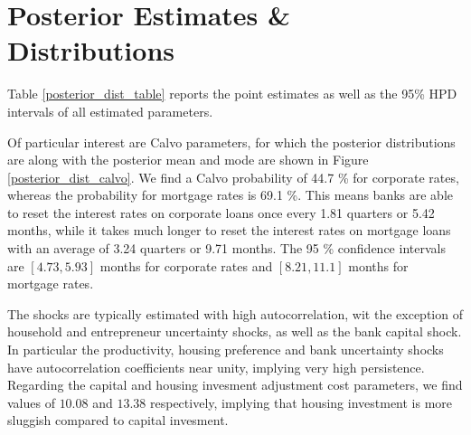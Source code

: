 \documentclass[12pt]{article}
\numberwithin{equation}{section}
\begin{document}
\section*{Posterior Estimates \& Distributions}

Table \ref{posterior_dist_table} reports the point estimates as well as the 95\% HPD intervals of all estimated parameters.

Of particular interest are Calvo parameters, for which the posterior distributions are along with the posterior mean and mode are shown in Figure \ref{posterior_dist_calvo}. We find a Calvo probability of 44.7 \% for corporate rates, whereas the probability for mortgage rates is 69.1 \%. This means banks are able to reset the interest rates on corporate loans once every 1.81 quarters or 5.42 months, while it takes much longer to reset the interest rates on mortgage loans with an average of 3.24 quarters or 9.71 months. The 95 \% confidence intervals are $[4.73,5.93]$ months for corporate rates and $[8.21,11.1]$ months for mortgage rates.

The shocks are typically estimated with high autocorrelation, wit the exception of household and entrepreneur uncertainty shocks, as well as the bank capital shock. In particular the productivity, housing preference and bank uncertainty shocks have autocorrelation coefficients near unity, implying very high persistence. Regarding the capital and housing invesment adjustment cost parameters, we find values of $10.08$ and $13.38$ respectively, implying that housing investment is more sluggish compared to capital invesment. 
\end{document}
